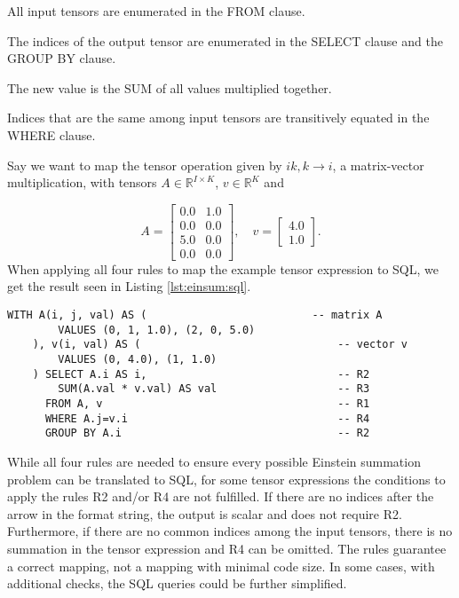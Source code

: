 \begin{description}[leftmargin=!,labelwidth=\widthof{\bfseries R1}]
    \item [R1] All input tensors are enumerated in the FROM clause.
    \item [R2] The indices of the output tensor are enumerated in the SELECT clause
          and the GROUP BY clause.
    \item [R3] The new value is the SUM of all values multiplied together.
    \item [R4] Indices that are the same among input tensors are transitively equated
          in the WHERE clause.
\end{description}
%
Say we want to map the tensor operation given by $ik,k \rightarrow i$, a matrix-vector
multiplication, with tensors $A \in \mathbb{R}^{I \times K}$, $v \in \mathbb{R}^{K}$ and

\begin{equation*}
    A =
    \begin{bmatrix}
        0.0 & 1.0 \\
        0.0 & 0.0 \\
        5.0 & 0.0 \\
        0.0 & 0.0
    \end{bmatrix},
    \quad
    v =
    \begin{bmatrix}
        4.0 \\
        1.0
    \end{bmatrix}.
\end{equation*}
%
When applying all four rules to map the example tensor expression to SQL, we get the result
seen in Listing \ref{lst:einsum:sql}.

\begin{lstlisting}[caption={Einstein summation in SQL.}, captionpos={t}, label={lst:einsum:sql}]
    WITH A(i, j, val) AS (                          -- matrix A
        VALUES (0, 1, 1.0), (2, 0, 5.0)
    ), v(i, val) AS (                               -- vector v
        VALUES (0, 4.0), (1, 1.0)
    ) SELECT A.i AS i,                              -- R2
        SUM(A.val * v.val) AS val                   -- R3
      FROM A, v                                     -- R1
      WHERE A.j=v.i                                 -- R4
      GROUP BY A.i                                  -- R2
\end{lstlisting}
%
While all four rules are needed to ensure every possible Einstein summation problem
can be translated to SQL, for some tensor expressions the conditions to apply the rules
R2 and/or R4 are not fulfilled. If there are no indices after the arrow in the format
string, the output is scalar and does not require R2. Furthermore, if there are no common
indices among the input tensors, there is no summation in the tensor expression and R4
can be omitted. The rules guarantee a correct mapping, not a mapping with minimal code size.
In some cases, with additional checks, the SQL queries could be further simplified.

